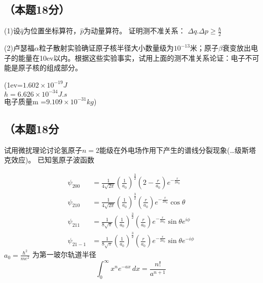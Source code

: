 \subsection{（本题18分）}
(1)设$\hat q$为位置坐标算符，$\hat p$为动量算符。
证明测不准关系：
$\Delta q.\Delta p\ge \frac{\hbar}{2}$

(2)卢瑟福$\alpha$粒子散射实验确证原子核半径大小数量级为$10^{-13}$米；原子$\beta$衰变放出电子的能量在10ev以内。根据这些实验事实，试用上面的测不准关系论证：电子不可能是原子核的组成部分。

(1ev=$1.602\times10^{-19}J$\\
$h=6.626\times10^{-34}J.s$\\
电子质量m =$9.109\times {10^{-31}kg}$)

\subsection{（本题18分}
试用微扰理论讨论氢原子$n=2$能级在外电场作用下产生的谱线分裂现象(…级斯塔克效应)。
已知氢原子波函数

\begin{equation}
\begin{aligned}
\psi_{200} &= \frac{1}{4\sqrt{2\pi}} \left( \frac{1}{a_0} \right)^{\frac{3}{2}} (2 - \frac{r}{a_0}) e^{-\frac{r}{2a_0}} \\
\psi_{210} &= \frac{1}{4\sqrt{2\pi}} \left( \frac{1}{a_0} \right)^{\frac{3}{2}} \left( \frac{r}{a_0} \right) e^{-\frac{r}{2a_0}} \cos \theta \\
\psi_{211} &= \frac{1}{8\sqrt{\pi}} \left( \frac{1}{a_0} \right)^{\frac{3}{2}} \left( \frac{r}{a_0} \right) e^{-\frac{r}{2a_0}} \sin \theta e^{i\phi} \\
\psi_{21-1} &= \frac{1}{8\sqrt{\pi}} \left( \frac{1}{a_0} \right)^{\frac{3}{2}} \left( \frac{r}{a_0} \right) e^{-\frac{r}{2a_0}} \sin \theta e^{-i\phi}
\end{aligned}~
\end{equation}
$ a_0 = \frac{\hbar^2}{me^2}$ 为第一玻尔轨道半径
$$ \begin{equation}
\int_{0}^{\infty} x^n e^{-ax} \, dx = \frac{n!}{a^{n+1}}
\end{equation}~$$